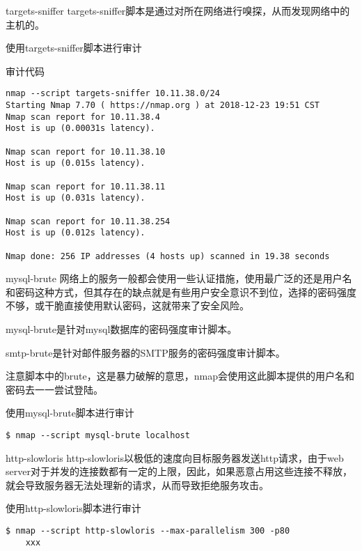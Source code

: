 \documentclass{beamer}
\begin{document}
\begin{frame}{targets-sniffer}
targets-sniffer脚本是通过对所在网络进行嗅探，从而发现网络中的主机的。
\end{frame}
\begin{frame}[fragile]{使用targets-sniffer脚本进行审计}
\begin{block}{审计代码}
\begin{verbatim}
nmap --script targets-sniffer 10.11.38.0/24
Starting Nmap 7.70 ( https://nmap.org ) at 2018-12-23 19:51 CST
Nmap scan report for 10.11.38.4
Host is up (0.00031s latency).

Nmap scan report for 10.11.38.10
Host is up (0.015s latency).

Nmap scan report for 10.11.38.11
Host is up (0.031s latency).

Nmap scan report for 10.11.38.254
Host is up (0.012s latency).

Nmap done: 256 IP addresses (4 hosts up) scanned in 19.38 seconds
\end{verbatim}
\end{block}
\end{frame}

\begin{frame}
\end{frame}
\begin{frame}[fragile]{mysql-brute}
网络上的服务一般都会使用一些认证措施，使用最广泛的还是用户名和密码这种方式，但其存在的缺点就是有些用户安全意识不到位，选择的密码强度不够，或干脆直接使用默认密码，这就带来了安全风险。

mysql-brute是针对mysql数据库的密码强度审计脚本。

smtp-brute是针对邮件服务器的SMTP服务的密码强度审计脚本。

注意脚本中的brute，这是暴力破解的意思，nmap会使用这此脚本提供的用户名和密码去一一尝试登陆。

\begin{block}{使用mysql-brute脚本进行审计}
\begin{verbatim}
$ nmap --script mysql-brute localhost
\end{verbatim}
\end{block}
\end{frame}
\begin{frame}
\end{frame}
\begin{frame}[fragile]{http-slowloris}
http-slowloris以极低的速度向目标服务器发送http请求，由于web server对于并发的连接数都有一定的上限，因此，如果恶意占用这些连接不释放，就会导致服务器无法处理新的请求，从而导致拒绝服务攻击。

\begin{block}{使用http-slowloris脚本进行审计}
\begin{verbatim}
$ nmap --script http-slowloris --max-parallelism 300 -p80 
    xxx
\end{verbatim}
\end{block}
\end{frame}
\end{document}
